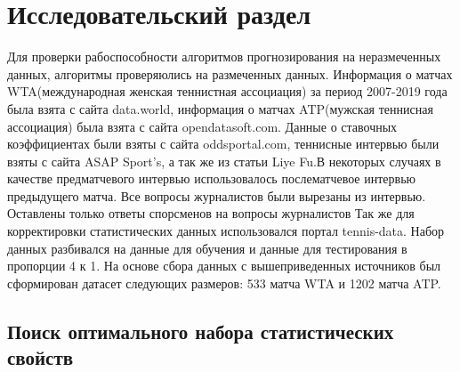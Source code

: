 \chapter{Исследовательский раздел}
Для проверки рабоспособности алгоритмов прогнозирования на неразмеченных данных, алгоритмы проверяюлись на размеченных данных.
Информация о матчах WTA(международная женская теннистная ассоциация) за период 2007-2019 года была взята с сайта data.world\cite{Book34}, информация о матчах ATP(мужская теннисная ассоциация) была взята с сайта opendatasoft.com\cite{Book35}.
Данные о ставочных коэффициентах были взяты с сайта oddsportal.com\cite{Book36}, теннисные интервью были взяты с сайта  ASAP
Sport’s\cite{Book37}, а так же из статьи Liye Fu\cite{Book38}.В некоторых случаях в качестве предматчевого интервью использовалось послематчевое интервью предыдущего матча. Все вопросы журналистов были вырезаны из интервью. Оставлены только ответы спорсменов на вопросы журналистов Так же для корректировки статистических данных использовался портал tennis-data\cite{Book39}. Набор данных разбивался на данные для обучения и данные для тестирования в пропорции 4 к 1.
На основе сбора данных с вышеприведенных источников был сформирован датасет следующих размеров: 533 матча WTA и 1202 матча ATP.
\section{Поиск оптимального набора статистических свойств}

